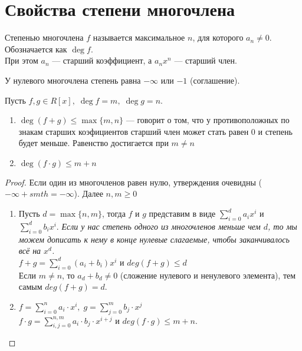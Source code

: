 
\section{Свойства степени многочлена}
\begin{normalsize}
\begin{conj}
Степенью многочлена $f$ называется максимальное $n$, для которого
$a_n \neq 0$. Обозначается как $\deg f$. \\
При этом $a_n$ --- старший коэффициент, 
а $a_nx^n$ --- старший член.
\end{conj}
\notice У нулевого многочлена степень равна $-\infty$ или $-1$ (соглашение).
\begin{theorem-non}
    Пусть $f,g \in R[x],\; \deg f = m,\; \deg g = n.$
    \begin{enumerate}
        \item $\deg(f+g) \leqslant \max\{m,n\}$ --- говорит о том,
        что у противоположных по знакам старших коэфициентов
        старший член может стать равен 0 и степень будет меньше.
        Равенство достигается при $m \neq n$
        \item $\deg(f\cdot g) \leqslant m + n$
    \end{enumerate}
\end{theorem-non}

\begin{proof}
    Если один из многочленов равен нулю,
    утверждения очевидны ($- \infty + smth = -\infty$).
    Далее $n,m \geqslant 0$
    \begin{enumerate}
        \item Пусть $d = \max \{n,m\}$, тогда 
        $f$ и $g$ представим в виде $\sum_{i=0}^{d} {a_ix^i}$ и $\sum_{i=0}^{d} {b_ix^i}$.
        \emph{Если у нас степень одного из многочленов меньше чем $d$, то мы можем дописать к нему в конце нулевые слагаемые, чтобы заканчивалось всё на $x^d$.} \\
        $f + g = \sum_{i=0}^{d} {(a_i + b_i)x^i}$ и $deg(f+g) \leqslant d$ \\
        Если $m\neq n$, то $a_d + b_d \neq 0$ (сложение нулевого и ненулевого элемента), тем самым $deg(f+g) = d$.
        \item $f = \sum_{i=0}^{n} {a_i\cdot x^i},\; g = \sum_{j=0}^{m} {b_j\cdot x^j}$ \\
        $f\cdot g = \sum_{i,j=0}^{n,m} {a_i\cdot b_j \cdot x^{i+j}}$ и $deg(f\cdot g) \leqslant m + n.$
    \end{enumerate}
\end{proof}


\end{normalsize}
